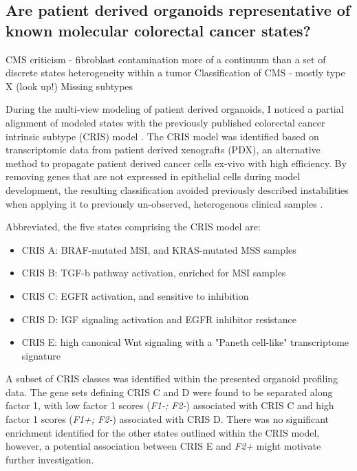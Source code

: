 \begin{flushleft}
\subsection{Are patient derived organoids representative of known molecular colorectal cancer states?}

CMS 
criticism - fibroblast contamination
more of a continuum than a set of discrete states
heterogeneity within a tumor
Classification of CMS - mostly type X (look up!)
Missing subtypes

During the multi-view modeling of patient derived organoids, I noticed a partial alignment of modeled states with the previously published colorectal cancer intrinsic subtype (CRIS) model \citep{isellaSelectiveAnalysisCancercell2017a}. The CRIS model was identified based on transcriptomic data from patient derived xenografts (PDX), an alternative method to propagate patient derived cancer cells ex-vivo with high efficiency. By removing genes that are not expressed in epithelial cells during model development, the resulting classification avoided previously described instabilities when applying it to previously un-observed, heterogenous clinical samples \citep{dunneCancercellIntrinsicGene2017}.

Abbreviated, the five states comprising the CRIS model are: 
\begin{itemize} 
    \item CRIS A: BRAF-mutated MSI, and KRAS-mutated MSS samples
    \item CRIS B: TGF-b pathway activation, enriched for MSI samples 
    \item CRIS C: EGFR activation, and sensitive to inhibition
    \item CRIS D: IGF signaling activation and EGFR inhibitor resistance
    \item CRIS E: high canonical Wnt signaling with a "Paneth cell-like" transcriptome signature
\end{itemize}

A subset of CRIS classes was identified within the presented organoid profiling data. The gene sets defining CRIS C and D were found to be separated along factor 1, with low factor 1 scores (\textit{F1-; F2-}) associated with CRIS C and high factor 1 scores (\textit{F1+; F2-}) associated with CRIS D. There was no significant enrichment identified for the other states outlined within the CRIS model, however, a potential association between CRIS E and \textit{F2+} might motivate further investigation.
\par


\end{flushleft}
